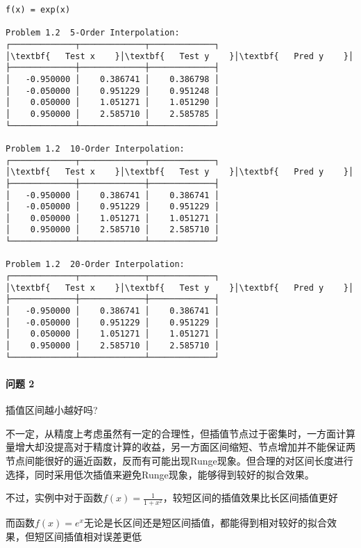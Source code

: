 \documentclass[11pt]{article}
\begin{document}
    \begin{Verbatim}[commandchars=\\\{\}]
f(x) = exp(x)

Problem 1.2  5-Order Interpolation:
┌─────────────┬─────────────┬─────────────┐
│\textbf{   Test x    }│\textbf{   Test y    }│\textbf{   Pred y    }│
├─────────────┼─────────────┼─────────────┤
│   -0.950000 │    0.386741 │    0.386798 │
│   -0.050000 │    0.951229 │    0.951248 │
│    0.050000 │    1.051271 │    1.051290 │
│    0.950000 │    2.585710 │    2.585785 │
└─────────────┴─────────────┴─────────────┘

Problem 1.2  10-Order Interpolation:
┌─────────────┬─────────────┬─────────────┐
│\textbf{   Test x    }│\textbf{   Test y    }│\textbf{   Pred y    }│
├─────────────┼─────────────┼─────────────┤
│   -0.950000 │    0.386741 │    0.386741 │
│   -0.050000 │    0.951229 │    0.951229 │
│    0.050000 │    1.051271 │    1.051271 │
│    0.950000 │    2.585710 │    2.585710 │
└─────────────┴─────────────┴─────────────┘

Problem 1.2  20-Order Interpolation:
┌─────────────┬─────────────┬─────────────┐
│\textbf{   Test x    }│\textbf{   Test y    }│\textbf{   Pred y    }│
├─────────────┼─────────────┼─────────────┤
│   -0.950000 │    0.386741 │    0.386741 │
│   -0.050000 │    0.951229 │    0.951229 │
│    0.050000 │    1.051271 │    1.051271 │
│    0.950000 │    2.585710 │    2.585710 │
└─────────────┴─────────────┴─────────────┘
    \end{Verbatim}

    \hypertarget{ux95eeux9898-2}{%
\paragraph{问题 2}\label{ux95eeux9898-2}}

插值区间越小越好吗?

不一定，从精度上考虑虽然有一定的合理性，但插值节点过于密集时，一方面计算量增大却没提高对于精度计算的收益，另一方面区间缩短、节点增加并不能保证两节点间能很好的逼近函数，反而有可能出现Runge现象。但合理的对区间长度进行选择，同时采用低次插值来避免Runge现象，能够得到较好的拟合效果。

不过，实例中对于函数\(f(x)=\frac{1}{1+x^2}\)，较短区间的插值效果比长区间插值更好

而函数\(f(x)=e^x\)无论是长区间还是短区间插值，都能得到相对较好的拟合效果，但短区间插值相对误差更低
\end{document}
